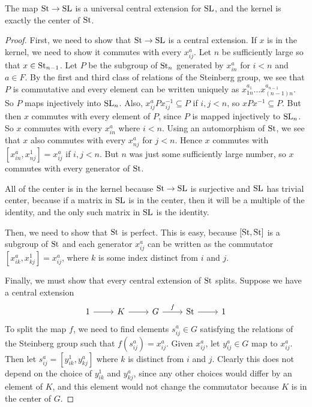 \begin{theorem}
    The map $\mathrm{St} \to \mathrm{SL}$ is a universal central extension for $\mathrm{SL}$, and the kernel is exactly the center of $\mathrm{St}$.
\end{theorem}
\begin{proof}
    First, we need to show that $\mathrm{St} \to \mathrm{SL}$ is a central extension. If $x$ is in the kernel, we need to show it commutes with every $x_{ij}^a$. Let $n$ be sufficiently large so that $x \in \mathrm{St}_{n - 1}$. Let $P$ be the subgroup of $\mathrm{St}_n$ generated by $x_{in}^a$ for $i < n$ and $a \in F$. By the first and third class of relations of the Steinberg group, we see that $P$ is commutative and every element can be written uniquely as $x_{1n}^{a_1} \ldots x_{(n - 1)n}^{a_{n - 1}}$. So $P$ maps injectively into $\mathrm{SL}_n$. Also, $x_{ij}^a P x_{ij}^{-1} \subseteq P$ if $i, j < n$, so $x P x^{-1} \subseteq P$. But then $x$ commutes with every element of $P$, since $P$ is mapped injectively to $\mathrm{SL}_n$. So $x$ commutes with every $x_{in}^a$ where $i < n$. Using an automorphism of $\mathrm{St}$, we see that $x$ also commutes with every $x_{nj}^a$ for $j < n$. Hence $x$ commutes with $[x_{in}^a, x_{nj}^1] = x_{ij}^a$ if $i, j < n$. But $n$ was just some sufficiently large number, so $x$ commutes with every generator of $\mathrm{St}$.

    All of the center is in the kernel because $\mathrm{St} \to \mathrm{SL}$ is surjective and $\mathrm{SL}$ has trivial center, because if a matrix in $\mathrm{SL}$ is in the center, then it will be a multiple of the identity, and the only such matrix in $\mathrm{SL}$ is the identity.


    Then, we need to show that $\mathrm{St}$ is perfect. This is easy, because $[\mathrm{St}, \mathrm{St}]$ is a subgroup of $\mathrm{St}$ and each generator $x_{ij}^a$ can be written as the commutator $[x_{ik}^a, x_{kj}^1] = x_{ij}^a$, where $k$ is some index distinct from $i$ and $j$.

    Finally, we must show that every central extension of $\mathrm{St}$ splits. Suppose we have a central extension
    \[
        \begin{tikzcd}
            \arrow[from=1-1, to=1-2]
            \arrow[from=1-2, to=1-3]
            \arrow["{f}", from=1-3, to=1-4]
            \arrow[from=1-4, to=1-5]
            1 & K & G & \St & 1
        \end{tikzcd}
    \]
    To split the map $f$, we need to find elements $s_{ij}^a \in G$ satisfying the relations of the Steinberg group such that $f(s_{ij}^a) = x_{ij}^a$. Given $x_{ij}^a$, let $y_{ij}^a \in G$ map to $x_{ij}^a$. Then let $s_{ij}^a = [y_{ik}^1, y_{kj}^a]$ where $k$ is distinct from $i$ and $j$. Clearly this does not depend on the choice of $y_{ik}^1$ and $y_{kj}^a$, since any other choices would differ by an element of $K$, and this element would not change the commutator because $K$ is in the center of $G$.
    

\end{proof}
